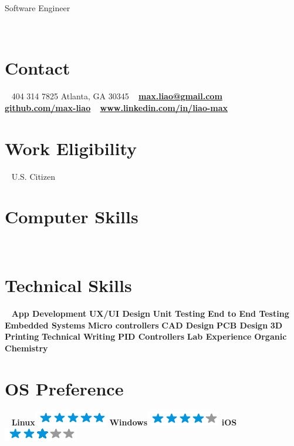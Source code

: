 \documentclass[]{cv}
\begin{document}
{Software Engineer}\\

\begin{aside}
	~
	~
	~
	~
	~
	\section{Contact}
	~
	404 314 7825
		{\small Atlanta, GA 30345}
	~
	\href{mailto:max.liao@gmail.com}{\textbf{max.liao@gmail.com}}
	~
	\href{github.com/max-liao}{\textbf{github.com/max-liao}}
	~
	\href{www.linkedin.com/in/liao-max}{\textbf{\scriptsize www.linkedin.com/in/liao-max}}
	~
	\section{\large Work Eligibility}
	~
	U.S. Citizen
	\section{\large Computer Skills}
	~
	~
	\section{\large Technical Skills}
	~
	\textbf{App Development}
	\textbf{UX/UI Design}
	\textbf{Unit Testing}
	\textbf{End to End Testing}
	\textbf{Embedded Systems}
	\textbf{Micro controllers}
	\textbf{CAD Design}
	\textbf{PCB Design}
	\textbf{3D Printing}
	\textbf{Technical Writing}
	\textbf{PID Controllers}
	\textbf{Lab Experience}
	\textbf{Organic Chemistry}
	~
	\section{OS Preference}
	~
	\textbf{Linux}\includegraphics[scale=0.40]{img/5stars.png}
	\textbf{Windows}\includegraphics[scale=0.40]{img/4stars.png}
	\textbf{iOS}\includegraphics[scale=0.40]{img/3stars.png}
	~
\end{aside}
\end{document}
